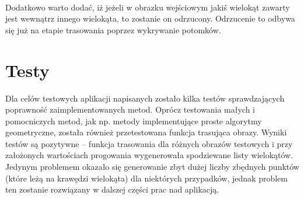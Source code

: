 \documentclass{article}
\let\oldsection\section
\renewcommand\section{\clearpage\oldsection} %
\begin{document}
~\\Dodatkowo warto dodać, iż jeżeli w obrazku wejściowym jakiś wielokąt zawarty jest wewnątrz innego wielokąta, to zostanie on odrzucony. Odrzucenie to odbywa się już na etapie trasowania poprzez wykrywanie potomków. 

\section{Testy}

Dla celów testowych aplikacji napisanych zostało kilka testów sprawdzających poprawność zaimplementowanych metod. Oprócz testowania małych i pomocniczych metod, jak np. metody implementujące proste algorytmy geometryczne, została również przetestowana funkcja trasująca obrazy. Wyniki testów są pozytywne – funkcja trasowania dla różnych obrazów testowych i przy założonych wartościach progowania wygenerowała spodziewane listy wielokątów. Jedynym problemem okazało się generowanie zbyt dużej liczby zbędnych punktów (które leżą na krawędzi wielokąta) dla niektórych przypadków, jednak problem ten zostanie rozwiązany w dalszej części prac nad aplikacją.
\end{document}
